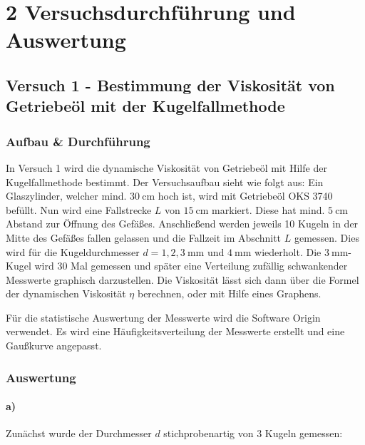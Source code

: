 \chapter*{2 Versuchsdurchführung und Auswertung}
\setcounter{chapter}{2}
\setcounter{section}{0}
\setcounter{subsection}{0}
 
    \section{Versuch 1 - Bestimmung der Viskosität von Getriebeöl mit der Kugelfallmethode}
    \label{sec:Versuch1}
        
        \subsection{Aufbau \& Durchführung}

            In Versuch 1 wird die dynamische Viskosität von Getriebeöl mit Hilfe der Kugelfallmethode bestimmt. Der Versuchsaufbau sieht wie folgt aus:
            Ein Glaszylinder, welcher mind. $30\ \mathrm{cm}$ hoch ist, wird mit Getriebeöl OKS 3740 befüllt. Nun wird eine Fallstrecke $L$ von $15\ \mathrm{cm}$ markiert. Diese hat mind. $5\ \mathrm{cm}$ Abstand zur Öffnung des Gefäßes. Anschließend werden jeweils 10 Kugeln in der Mitte des Gefäßes fallen gelassen und die Fallzeit im Abschnitt $L$ gemessen. Dies wird für die Kugeldurchmesser $d = 1, 2, 3\ \mathrm{mm}$ und $4\ \mathrm{mm}$ wiederholt. Die $3\ \mathrm{mm}$-Kugel wird 30 Mal gemessen und später eine Verteilung zufällig schwankender Messwerte graphisch darzustellen.
            Die Viskosität lässt sich dann über die Formel der dynamischen Viskosität $\eta$ berechnen, oder mit Hilfe eines Graphens.

            Für die statistische Auswertung der Messwerte wird die Software Origin verwendet. Es wird eine Häufigkeitsverteilung der Messwerte erstellt und eine Gaußkurve angepasst.

        \subsection{Auswertung}

            \subsubsection{a)}

            Zunächst wurde der Durchmesser $d$ stichprobenartig von $3$ Kugeln gemessen:

